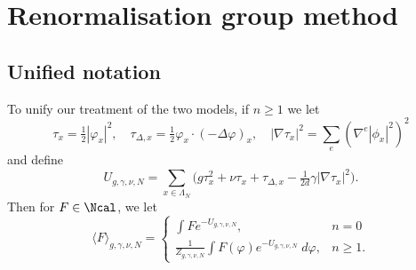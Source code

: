 \chapter{Renormalisation group method}





\section{Unified notation}

To unify our treatment of the two models, if $n \ge 1$ we let
\begin{equation}
\tau_x = \tfrac{1}{2} |\varphi_x|^2,
  \quad
\tau_{\Delta,x} = \tfrac{1}{2} \varphi_x \cdot (-\Delta \varphi)_x,
  \quad
|\nabla\tau_x|^2 = \sum_e (\nabla^e |\phi_x|^2)^2
\end{equation}
and define
\begin{equation}
U_{g,\gamma,\nu,N}
  =
\sum_{x\in\Lambda_N}
\Big(
  g \tau_x^2 + \nu \tau_x + \tau_{\Delta,x} - \tfrac{1}{2 d} \gamma |\nabla\tau_x|^2
\Big).
\end{equation}
Then for $F \in \Ncal$, we let
\begin{equation}
\langle F \rangle_{g,\gamma,\nu,N}
  =
\begin{cases}
\int F e^{-U_{g,\gamma,\nu,N}},               & n = 0 \\
\frac{1}{Z_{g,\gamma,\nu,N}}
  \int F(\varphi) e^{-U_{g,\gamma,\nu,N}} \; d\varphi,  & n \ge 1.
\end{cases}
\end{equation}

